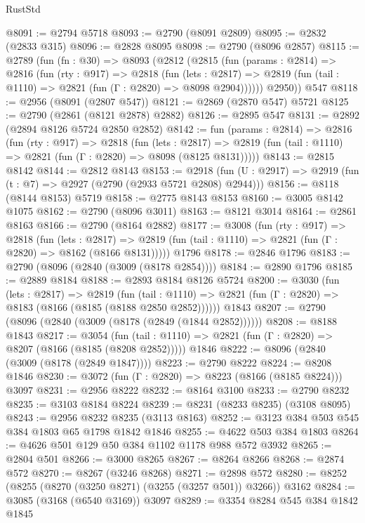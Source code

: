 \begin{lexlean}{RustStd}
\begin{coremodule}
@8091 := @2794 @5718
@8093 := @2790 (@8091 @2809)
@8095 := @2832 (@2833 @315)
@8096 := @2828 @8095
@8098 := @2790 (@8096 @2857)
@8115 := @2789
    (fun (fn : @30) =>
    @8093
      (@2812
        (@2815
          (fun (params : @2814) =>
          @2816
            (fun (rty : @917) =>
            @2818
              (fun (lets : @2817) =>
              @2819 (fun (tail : @1110) => @2821 (fun (Γ : @2820) => @8098 @2904))))))
        @2950))
    @547
@8118 := @2956 (@8091 (@2807 @547))
@8121 := @2869 (@2870 @547) @5721
@8125 := @2790 (@2861 (@8121 @2878) @2882)
@8126 := @2895 @547
@8131 := @2892 (@2894 @8126 @5724 @2850 @2852)
@8142 := fun (params : @2814) =>
  @2816
    (fun (rty : @917) =>
    @2818
      (fun (lets : @2817) =>
      @2819 (fun (tail : @1110) => @2821 (fun (Γ : @2820) => @8098 (@8125 @8131)))))
@8143 := @2815 @8142
@8144 := @2812 @8143
@8153 := @2918 (fun (U : @2917) => @2919 (fun (t : @7) => @2927 (@2790 (@2933 @5721 @2808) @2944)))
@8156 := @8118 (@8144 @8153) @5719
@8158 := @2775 @8143 @8153
@8160 := @3005 @8142 @1075
@8162 := @2790 (@8096 @3011)
@8163 := @8121 @3014
@8164 := @2861 @8163
@8166 := @2790 (@8164 @2882)
@8177 := @3008
    (fun (rty : @917) =>
    @2818
      (fun (lets : @2817) =>
      @2819 (fun (tail : @1110) => @2821 (fun (Γ : @2820) => @8162 (@8166 @8131)))))
    @1796
@8178 := @2846 @1796
@8183 := @2790 (@8096 (@2840 (@3009 (@8178 @2854))))
@8184 := @2890 @1796
@8185 := @2889 @8184
@8188 := @2893 @8184 @8126 @5724
@8200 := @3030
    (fun (lets : @2817) =>
    @2819
      (fun (tail : @1110) => @2821 (fun (Γ : @2820) => @8183 (@8166 (@8185 (@8188 @2850 @2852))))))
    @1843
@8207 := @2790 (@8096 (@2840 (@3009 (@8178 (@2849 (@1844 @2852))))))
@8208 := @8188 @1843
@8217 := @3054
    (fun (tail : @1110) => @2821 (fun (Γ : @2820) => @8207 (@8166 (@8185 (@8208 @2852)))))
    @1846
@8222 := @8096 (@2840 (@3009 (@8178 (@2849 @1847))))
@8223 := @2790 @8222
@8224 := @8208 @1846
@8230 := @3072 (fun (Γ : @2820) => @8223 (@8166 (@8185 @8224))) @3097
@8231 := @2956 @8222
@8232 := @8164 @3100
@8233 := @2790 @8232
@8235 := @3103 @8184 @8224
@8239 := @8231 (@8233 @8235) (@3108 @8095)
@8243 := @2956 @8232 @8235 (@3113 @8163)
@8252 := @3123 @384 @503 @545 @384 @1803 @65 @1798 @1842 @1846
@8255 := @4622 @503 @384 @1803
@8264 := @4626 @501 @129 @50 @384 @1102 @1178 @988 @572 @3932
@8265 := @2804 @501
@8266 := @3000 @8265
@8267 := @8264 @8266
@8268 := @2874 @572
@8270 := @8267 (@3246 @8268)
@8271 := @2898 @572
@8280 := @8252 (@8255 (@8270 (@3250 @8271) (@3255 (@3257 @501)) @3266)) @3162
@8284 := @3085 (@3168 (@6540 @3169)) @3097
@8289 := @3354 @8284 @545 @384 @1842 @1845

\end{coremodule}
\end{lexlean}
